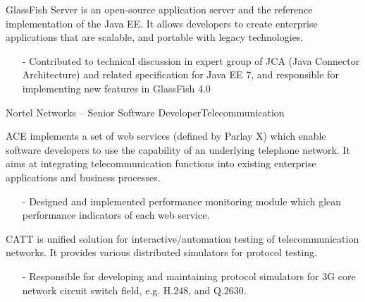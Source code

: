 \documentclass[10pt,a4paper]{moderncv}
\begin{document}
\vspace*{0.2\baselineskip}
{
  GlassFish Server is an open-source application server  and the reference implementation of the Java EE. It allows developers to create enterprise
  applications that are scalable, and portable with legacy technologies.
  \begin{itemize}
    \item[-]Contributed to technical discussion in expert group of JCA (Java Connector Architecture) and related specification for Java EE 7, and responsible for implementing new features in GlassFish 4.0
  \end{itemize}
}

\vspace{2ex}
\vspace*{0.4\baselineskip}

{Nortel Networks -- Senior Software Developer}{Telecommunication}{}{}{}
{
  ACE implements a set of web services (defined by Parlay X) which enable software developers to use the capability of an underlying telephone network. It aims at integrating telecommunication functions into existing enterprise applications and business processes.
  \begin{itemize}
    \item[-] Designed and implemented performance monitoring module which glean performance indicators of each web service.
  \end{itemize}
}
\vspace*{0.4\baselineskip}

\vspace*{0.2\baselineskip}
{
  CATT is unified solution for interactive/automation testing of telecommunication networks. It provides various distributed simulators for protocol testing.
  \begin{itemize}
    \item[-] Responsible for developing and maintaining protocol simulators for 3G core network circuit switch field, e.g. H.248, and Q.2630.
  \end{itemize}
}
\end{document}
